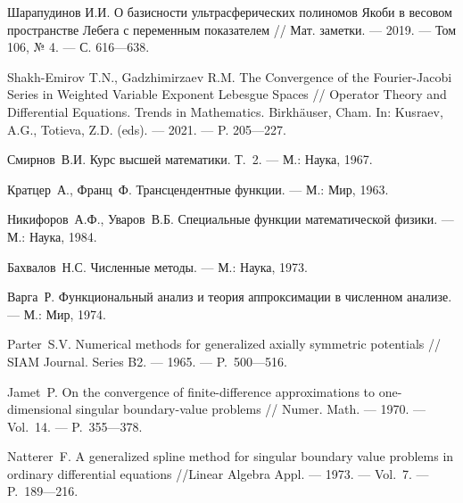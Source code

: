 \begin{thebibliography}{11}
Шарапудинов И.И. О базисности ультрасферических полиномов Якоби в весовом пространстве Лебега с переменным показателем // Мат. заметки. --- 2019. --- Том 106, № 4. --- С. 616---638.





Shakh-Emirov T.N., Gadzhimirzaev R.M.  The Convergence of the Fourier-Jacobi Series in Weighted Variable Exponent Lebesgue Spaces // Operator Theory and Differential Equations. Trends in Mathematics. Birkhäuser, Cham.  In: Kusraev, A.G., Totieva, Z.D. (eds). --- 2021. --- P. 205---227.
    




Смирнов~В.И. Курс высшей математики. Т.~2.
--- М.: Наука, 1967. 





Кратцер~А., Франц~Ф. Трансцендентные функции.
 --- М.: Мир, 1963.





Никифоров~А.Ф., Уваров~В.Б. Специальные функции математической физики.
 --- М.: Наука, 1984.





Бахвалов~Н.С. Численные методы.
--- М.: Наука, 1973. 





Варга~Р. Функциональный анализ и теория аппроксимации
в численном анализе. --- М.: Мир, 1974. 





Parter~S.V. Numerical methods for generalized axially symmetric potentials
 // SIAM Journal. Series B2.  --- 1965.  --- P.~500---516.





Jamet~P. On the convergence of finite-difference 
approximations to one-dimensional singular boundary-value problems
 // Numer. Math.  --- 1970. --- Vol.~14. --- P.~355---378.





Natterer~F. A generalized spline method for singular boundary value problems in ordinary differential equations
 //Linear Algebra Appl. --- 1973. --- Vol.~7. --- P.~189---216.






\end{thebibliography}
